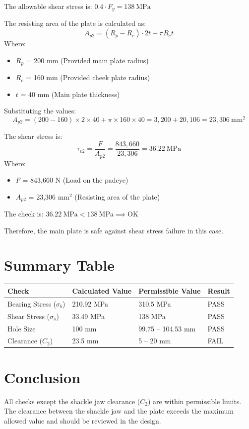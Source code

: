 \documentclass[12pt]{article}
\begin{document}
The allowable shear stress is:
\(
0.4 \cdot F_{y} = 138\ \mathrm{MPa}
\)

The resisting area of the plate is calculated as:
\[
A_{p2} = (R_p - R_c) \cdot 2t + \pi R_c t
\]
Where:
\begin{itemize}
  \item $R_p$ = 200 mm (Provided main plate radius)
  \item $R_c$ = 160 mm (Provided cheek plate radius)
  \item $t$ = 40 mm (Main plate thickness)
\end{itemize}

Substituting the values:
\[
A_{p2} = (200 - 160) \times 2 \times 40 + \pi \times 160 \times 40 = 3,200 + 20,106 = 23,306\ \mathrm{mm}^2
\]

The shear stress is:
\[
\tau_{v2} = \frac{F}{A_{p2}} = \frac{843,660}{23,306} = 36.22\ \mathrm{MPa}
\]
Where:
\begin{itemize}
  \item $F$ = 843,660 N (Load on the padeye)
  \item $A_{p2}$ = 23,306 mm$^2$ (Resisting area of the plate)
\end{itemize}

The check is:
\(
36.22\ \mathrm{MPa} < 138\ \mathrm{MPa} \implies \text{OK}
\)

Therefore, the main plate is safe against shear stress failure in this case.

\section{Summary Table}
\begin{center}
\begin{tabular}{|l|l|l|l|}
\hline
Check & Calculated Value & Permissible Value & Result \\
\hline
Bearing Stress ($\sigma_b$) & 210.92 MPa & 310.5 MPa & PASS \\
Shear Stress ($\sigma_s$) & 33.49 MPa & 138 MPa & PASS \\
Hole Size & 100 mm & 99.75 -- 104.53 mm & PASS \\
Clearance ($C_2$) & 23.5 mm & 5 -- 20 mm & FAIL \\
\hline
\end{tabular}
\end{center}

\section{Conclusion}
All checks except the shackle jaw clearance ($C_2$) are within permissible limits. The clearance between the shackle jaw and the plate exceeds the maximum allowed value and should be reviewed in the design.
\end{document}
